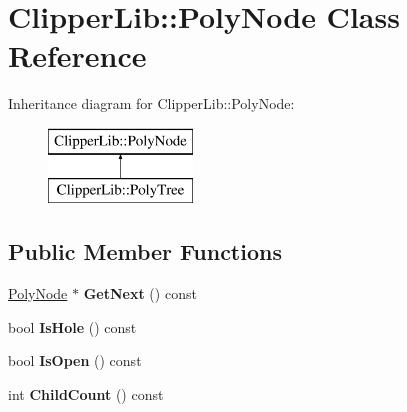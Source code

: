 \hypertarget{class_clipper_lib_1_1_poly_node}{}\section{Clipper\+Lib\+:\+:Poly\+Node Class Reference}
\label{class_clipper_lib_1_1_poly_node}
Inheritance diagram for Clipper\+Lib\+:\+:Poly\+Node\+:\begin{figure}[H]
\begin{center}
\leavevmode
\includegraphics[height=2.000000cm]{class_clipper_lib_1_1_poly_node}
\end{center}
\end{figure}
\subsection*{Public Member Functions}
\begin{DoxyCompactItemize}
\item 
\mbox{\label{class_clipper_lib_1_1_poly_node_adbcb861001d8bfbd609c4ba4f4a19a58}} 
\mbox{\hyperlink{class_clipper_lib_1_1_poly_node}{Poly\+Node}} $\ast$ {\bfseries Get\+Next} () const
\item 
\mbox{\label{class_clipper_lib_1_1_poly_node_a0467801cae1b28ad8a4917b96e551536}} 
bool {\bfseries Is\+Hole} () const
\item 
\mbox{\label{class_clipper_lib_1_1_poly_node_ac9ade640af2515976d337b65e8e84776}} 
bool {\bfseries Is\+Open} () const
\item 
\mbox{\label{class_clipper_lib_1_1_poly_node_a19128db6fb2aca66555231edaffa7ade}} 
int {\bfseries Child\+Count} () const
\end{DoxyCompactItemize}
